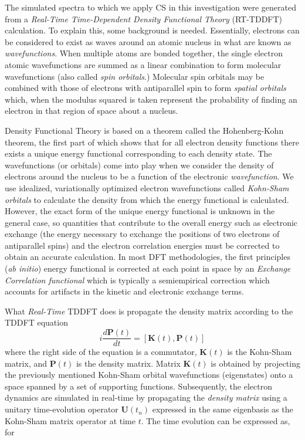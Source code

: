 \documentclass[11pt]{article}
\begin{document}
\par The simulated spectra to which we apply CS in this investigation were generated from a \emph{Real-Time Time-Dependent Density Functional Theory} (RT-TDDFT) calculation. To explain this, some background is needed. Essentially, electrons can be considered to exist as waves around an atomic nucleus in what are known as \emph{wavefunctions}.  When multiple atoms are bonded together, the single electron atomic wavefunctions are summed as a linear combination to form molecular wavefunctions (also called \emph{spin orbitals}.) Molecular spin orbitals may be combined with those of electrons with antiparallel spin to form \emph{spatial orbitals} which, when the modulus squared is taken represent the probability of finding an electron in that region of space about a nucleus.\\

\par Density Functional Theory is based on a theorem called the Hohenberg-Kohn theorem, the first part of which shows that for all electron density functions there exists a unique energy functional corresponding to each density state.  The wavefunctions (or orbitals) come into play when we consider the density of electrons around the nucleus to be a function of the electronic \emph{wavefunction}.  We use idealized, variationally optimized electron wavefunctions called \emph{Kohn-Sham orbitals} to calculate the density from which the energy functional is calculated. However, the exact form of the unique energy functional is unknown in the general case, so quantities that contribute to the overall energy such as electronic exchange (the energy necessary to exchange the positions of two electrons of antiparallel spins) and the electron correlation energies must be corrected to obtain an accurate calculation.  In most DFT methodologies, the first principles (\emph{ab initio}) energy functional is corrected at each point in space by an \emph{Exchange Correlation functional} which is typically a semiempirical correction which accounts for artifacts in the kinetic and electronic exchange terms.\\

\par What \emph{Real-Time} TDDFT does is propagate the density matrix according to the TDDFT equation
\begin{equation}\label{eq:tddft}
	i\frac{d\mathbf{P}(t)}{dt} = [\mathbf{K}(t), \mathbf{P}(t)]
\end{equation}
where the right side of the equation is a commutator, $\mathbf{K}(t)$ is the Kohn-Sham matrix, and $\mathbf{P}(t)$ is the density matrix.  Matrix $\mathbf{K}(t)$ is obtained by projecting the previously mentioned Kohn-Sham orbital wavefunctions (eigenstates) onto a space spanned by a set of supporting functions. Subsequently, the electron dynamics are simulated in real-time by propagating the \emph{density matrix} using a unitary time-evolution operator $\mathbf{U}(t_{n})$ expressed in the same eigenbasis as the Kohn-Sham matrix operator at time $t$.  The time evolution can be expressed as, for 
\end{document}
